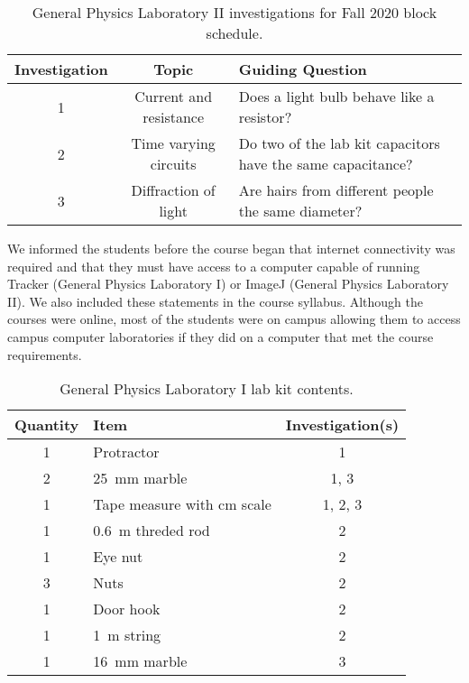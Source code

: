 \documentclass[aip, preprint, numerical]{revtex4-2}
\begin{document}
\begin{table}
    \caption{\label{tab: 1261 fall} General Physics Laboratory II investigations for Fall 2020 block schedule.}
    \begin{ruledtabular}
        \begin{tabular}{ccp{26em}}
            Investigation & Topic & Guiding Question\\
            \hline
            1 & Current and resistance & Does a light bulb behave like a resistor? \\
            2 & Time varying circuits & Do two of the lab kit capacitors have the same capacitance? \\
            3 & Diffraction of light & Are hairs from different people the same diameter?
        \end{tabular}
    \end{ruledtabular}
\end{table}

We informed the students before the course began that internet connectivity was required and that they must have access to a computer capable of running Tracker (General Physics Laboratory I) or ImageJ (General Physics Laboratory II). We also included these statements in the course syllabus. Although the courses were online, most of the students were on campus allowing them to access campus computer laboratories if they did on a computer that met the course requirements.
  
 \begin{table}
    \caption{\label{tab: 1251 lab kit} General Physics Laboratory I lab kit contents.}
        \begin{tabular}{clc}
            \hline\hline
            Quantity & Item & Investigation(s)\\
            \hline
            1 & Protractor & 1 \\
            2 & \SI{25}{mm} marble & 1, 3 \\
            1 & Tape measure with cm scale & 1, 2, 3\\
            1 & \SI{0.6}{m} threded rod & 2 \\
            1 & Eye nut & 2 \\
            3 & Nuts & 2 \\
            1 & Door hook & 2 \\
            1 & \SI{1}{m} string & 2 \\
            1 & \SI{16}{mm} marble & 3 \\
            \hline\hline
        \end{tabular}
\end{table}
\end{document}
